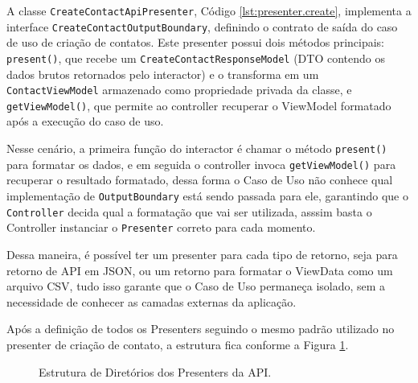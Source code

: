     \par A classe \texttt{CreateContactApiPresenter}, Código \ref{lst:presenter.create}, implementa a interface \texttt{CreateContactOutputBoundary}, definindo o contrato de saída do caso de uso de criação de contatos. Este presenter possui dois métodos principais: \texttt{present()}, que recebe um \texttt{CreateContactResponseModel} (DTO contendo os dados brutos retornados pelo interactor) e o transforma em um \texttt{ContactViewModel} armazenado como propriedade privada da classe, e \texttt{getViewModel()}, que permite ao controller recuperar o ViewModel formatado após a execução do caso de uso. 

    
    
    \par Nesse cenário, a primeira função do interactor é chamar o método \texttt{present()} para formatar os dados, e em seguida o controller invoca \texttt{getViewModel()} para recuperar o resultado formatado, dessa forma o Caso de Uso não conhece qual implementação de \texttt{OutputBoundary} está sendo passada para ele, garantindo que o \texttt{Controller} decida qual a formatação que vai ser utilizada, asssim basta o Controller instanciar o \texttt{Presenter} correto para cada momento.

    \par Dessa maneira, é possível ter um presenter para cada tipo de retorno, seja para retorno de API em JSON, ou um retorno para formatar o ViewData como um arquivo CSV, tudo isso garante que o Caso de Uso permaneça isolado, sem a necessidade de conhecer as camadas externas da aplicação. 

    \par Após a definição de todos os Presenters seguindo o mesmo padrão utilizado no presenter de criação de contato, a estrutura fica conforme a Figura \ref{fig:estrutura-api-presenters}.

    \begin{figure}[H]
        \caption{Estrutura de Diretórios dos Presenters da API.}
        \label{fig:estrutura-api-presenters}
        

    \end{figure}

